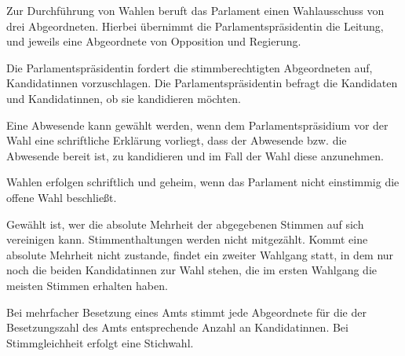 \documentclass{sasbase}
\begin{document}
\begin{article}[Wahl]
\item Zur Durchführung von Wahlen beruft das Parlament einen Wahlausschuss von drei Abgeordneten. Hierbei \"{u}bernimmt die Parlamentspr\"{a}sidentin die Leitung, und jeweils eine Abgeordnete von Opposition und Regierung.
\item Die Parlamentspr\"{a}sidentin fordert die stimmberechtigten Abgeordneten auf, Kandidatinnen vorzuschlagen. Die Parlamentspr\"{a}sidentin befragt die Kandidaten und Kandidatinnen, ob sie kandidieren möchten.
\item Eine Abwesende kann gewählt werden, wenn dem Parlamentspr\"{a}sidium vor der Wahl eine schriftliche Erklärung vorliegt, dass der Abwesende bzw. die Abwesende bereit ist, zu kandidieren und im Fall der Wahl diese anzunehmen.
\item Wahlen erfolgen schriftlich und geheim, wenn das Parlament nicht einstimmig die offene Wahl beschließt.
\item Gewählt ist, wer die absolute Mehrheit der abgegebenen Stimmen auf sich vereinigen kann. Stimmenthaltungen werden nicht mitgezählt. Kommt eine absolute Mehrheit nicht zustande, findet ein zweiter Wahlgang statt, in dem nur noch die beiden Kandidatinnen zur Wahl stehen, die im ersten Wahlgang die meisten Stimmen erhalten haben.
\item Bei mehrfacher Besetzung eines Amts stimmt jede Abgeordnete für die der Besetzungszahl des Amts
    entsprechende Anzahl an Kandidatinnen. Bei Stimmgleichheit erfolgt eine Stichwahl.
\end{article}
\end{document}

